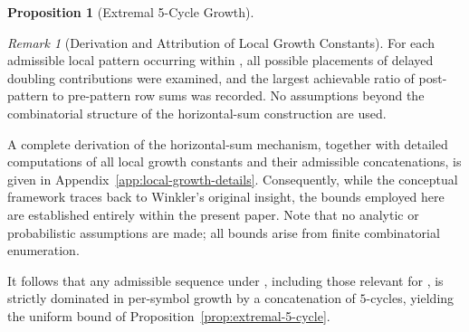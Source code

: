 \documentclass[12pt, oneside]{article}
\numberwithin{equation}{section}
\theoremstyle{definition}
\newtheorem{proposition}{Proposition}[section]
\theoremstyle{plain}
\theoremstyle{remark}
\newtheorem*{remark}{Remark}
\begin{document}
\begin{proposition}[Extremal 5-Cycle Growth]
\begin{remark}[Derivation and Attribution of Local Growth Constants]
For each admissible local pattern occurring within , all possible
placements of delayed doubling contributions were examined, and the largest
achievable ratio of post-pattern to pre-pattern row sums was recorded. No
assumptions beyond the combinatorial structure of the horizontal-sum
construction are used.

A complete derivation of the horizontal-sum mechanism, together with detailed
computations of all local growth constants and their admissible concatenations,
is given in Appendix~\ref{app:local-growth-details}. Consequently, while the
conceptual framework traces back to Winkler’s original insight, the bounds
employed here are established entirely within the present paper.  Note that no
analytic or probabilistic assumptions are made; all bounds arise from finite
combinatorial enumeration.

It follows that any admissible sequence under , including those
relevant for , is strictly dominated in per-symbol growth by a
concatenation of $5$-cycles, yielding the uniform bound of
Proposition~\ref{prop:extremal-5-cycle}.
\end{remark}







\end{proposition}
\end{document}
